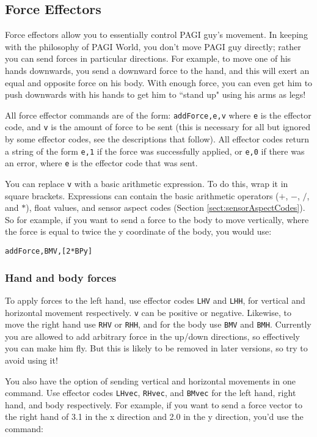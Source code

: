 \subsection{Force Effectors}

Force effectors allow you to essentially control PAGI guy's movement. In keeping with the philosophy of PAGI World, you don't move PAGI guy directly; rather you can send forces in particular directions. For example, to move one of his hands downwards, you send a downward force to the hand, and this will exert an equal and opposite force on his body. With enough force, you can even get him to push downwards with his hands to get him to ``stand up" using his arms as legs!

All force effector commands are of the form: \texttt{addForce,e,v} where \texttt{e} is the effector code, and \texttt{v} is the amount of force to be sent (this is necessary for all but ignored by some effector codes, see the descriptions that follow). All effector codes return a string of the form \texttt{e,1} if the force was successfully applied, or \texttt{e,0} if there was an error, where \texttt{e} is the effector code that was sent.

You can replace \texttt{v} with a basic arithmetic expression. To do this, wrap it in square brackets. Expressions can contain the basic arithmetic operators ($+$, $-$, $/$, and $*$), float values, and sensor aspect codes (Section \ref{sect:sensorAspectCodes}). So for example, if you want to send a force to the body to move vertically, where the force is equal to twice the y coordinate of the body, you would use:

\texttt{addForce,BMV,[2*BPy]}

\subsubsection{Hand and body forces}

To apply forces to the left hand, use effector codes \texttt{LHV} and \texttt{LHH}, for vertical and horizontal movement respectively. \texttt{v} can be positive or negative. Likewise, to move the right hand use \texttt{RHV} or \texttt{RHH}, and for the body use \texttt{BMV} and \texttt{BMH}. Currently you are allowed to add arbitrary force in the up/down directions, so effectively you can make him fly. But this is likely to be removed in later versions, so try to avoid using it!

You also have the option of sending vertical and horizontal movements in one command. Use effector codes \texttt{LHvec}, \texttt{RHvec}, and \texttt{BMvec} for the left hand, right hand, and body respectively. For example, if you want to send a force vector to the right hand of 3.1 in the x direction and 2.0 in the y direction, you'd use the command:

